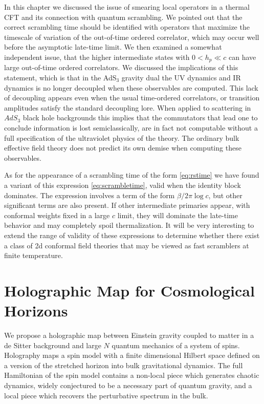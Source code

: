 \documentclass{brownthesis}
\begin{document}
In this chapter we discussed the issue of smearing local operators in
a thermal CFT and its connection with quantum scrambling. We pointed
out that the correct scrambling time should be identified with operators
that maximize the timescale of variation of the out-of-time ordered
correlator, which may occur well before the asymptotic late-time limit.
We then examined a somewhat independent issue, that the higher intermediate
states with $0<h_{p}\ll c$ can have large out-of-time ordered correlators.
We discussed the implications of this statement, which is that in
the AdS$_{3}$ gravity dual the UV dynamics and IR dynamics is no
longer decoupled when these observables are computed. This lack of
decoupling appears even when the usual time-ordered correlators, or
transition amplitudes satisfy the standard decoupling lore. When applied
to scattering in $AdS_{3}$ black hole backgrounds this implies that
the commutators that lead one to conclude information is lost semiclassically,
are in fact not computable without a full specification of the ultraviolet
physics of the theory. The ordinary bulk effective field theory does
not predict its own demise when computing these observables.

As for the appearance of a scrambling time of the form \eqref{eq:rstime}
we have found a variant of this expression \eqref{eq:scrambletime},
valid when the identity block dominates. The expression involves a
term of the form $\beta/2\pi\log c$, but other significant terms
are also present. If other intermediate primaries appear, with conformal
weights fixed in a large $c$ limit, they will dominate the late-time
behavior and may completely spoil thermalization. It will be very
interesting to extend the range of validity of these expressions to
determine whether there exist a class of 2d conformal field theories
that may be viewed as fast scramblers at finite temperature.


\chapter{Holographic Map for Cosmological Horizons}\label{chap:map}
We propose a holographic map between Einstein gravity coupled to matter
in a de Sitter background and large $N$ quantum mechanics of a system
of spins. Holography maps a spin model with a finite dimensional Hilbert
space defined on a version of the stretched horizon into bulk gravitational
dynamics. The full Hamiltonian of the spin model contains a non-local
piece which generates chaotic dynamics, widely conjectured to be a
necessary part of quantum gravity, and a local piece which recovers
the perturbative spectrum in the bulk.
\end{document}
